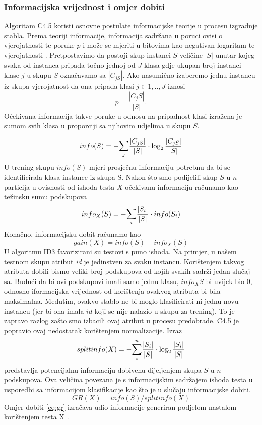 \subsubsection{Informacijska vrijednost i omjer dobiti}
Algoritam C4.5 koristi osnovne postulate informacijske teorije u procesu izgradnje stabla. Prema teoriji informacije, informacija sadržana u poruci ovisi o vjerojatnosti te poruke $p$ i može se mjeriti u bitovima kao negativan logaritam te vjerojatnosti \cite{Shannon01}. Pretpostavimo da postoji skup instanci $S$ veličine $|S|$ unutar kojeg svaka od instanca pripada točno jednoj od $J$ klasa gdje ukupan broj instanci klase $j$ u skupu $S$ označavamo sa $|C_{jS}|$. Ako nasumično izaberemo jednu instancu iz skupa vjerojatnost da ona pripada klasi $j\in{1,..,J}$ iznosi\begin{equation}
p = \frac{|C_jS|}{|S|}.
\end{equation}
Očekivana informacija takve poruke u odnosu na pripadnost klasi izražena je sumom svih klasa u proporciji sa njihovim udjelima u skupu $S$. 

\begin{equation}
info(S) = -\mathlarger{\sum}_{j}\frac{|C_{jS}|}{|S|}\cdot\log_{2}\frac{|C_{jS}|}{|S|}
\end{equation}
U trening skupu $info(S)$ mjeri prosječnu informaciju potrebnu da bi se identificirala klasa instance iz skupa S. Nakon što smo podijelili skup $S$ u $n$ particija u ovisnosti od ishoda testa $X$ očekivanu informaciju računamo kao težinsku sumu podskupova
\begin{equation}
info_{X}(S) = -\mathlarger{\sum}_{i}\frac{|S_{i}|}{|S|}\cdot info(S_{i})
\end{equation}
Konačno, informacijsku dobit računamo kao
\begin{equation}
gain(X) = info(S)-info_{X}(S)
\end{equation}
U algoritmu ID3 favorizirani su testovi s puno ishoda. Na primjer, u našem testnom skupu atribut \textit{id} je jedinstven za svaku instancu. Korištenjem takvog atributa dobili bismo veliki broj podskupova od kojih svakih sadrži jedan slučaj sa. Budući da bi ovi podskupovi imali samo jednu klasu, $info_{X}S$ bi uvijek bio 0, odnosno iformacijska vrijednost od korištenja ovakvog atributa bi bila maksimalna. Međutim, ovakvo stablo ne bi moglo klasificirati ni jednu novu instancu (jer bi ona imala $id$ koji se nije nalazio u skupu za trening). To je zapravo razlog zašto smo izbacili ovaj atribut u procesu predobrade. C4.5 je popravio ovaj nedostatak korištenjem normalizacije. Izraz
\begin{equation}
split info(X) = -\mathlarger{\sum}_{i}^{n}\frac{|S_{i}|}{|S|}\cdot\log_{2}\frac{|S_{i}|}{|S|}
\end{equation}
predstavlja potencijalnu informaciju dobivenu dijeljenjem skupa $S$ u $n$ podskupova. Ova veličina povezana je s informacijskim sadržajem ishoda testa u usporedbi sa informacijom klasifikacije kao što je u slučaju informacijske dobiti.
\begin{equation}
\label{eq:gr}
GR(X) = info(S)/split info(X)
\end{equation}
Omjer dobiti \ref{eq:gr} izračava udio informacije generiran podjelom nastalom korištenjem testa X \cite{Quinlan02}.

